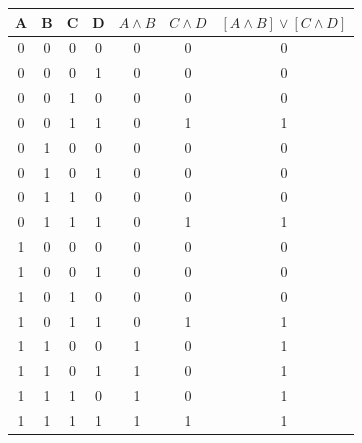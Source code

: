 \documentclass[a4paper,parskip=full-]{article}
\begin{document}
\begin{figure}[H]
    \centering
    \begin{subfigure}[b]{0.4\textwidth}

\begin{tabular}{|c|c|c|c|c|c|c|}
\hline
A & B & C & D & $A \land B$ & $C \land D$ & $[A \land B] \lor [C \land D]$ \\
\hline
0 & 0 & 0 & 0 & 0 & 0 & 0 \\
\hline
0 & 0 & 0 & 1 & 0 & 0 & 0  \\
\hline
0 & 0 & 1 & 0 & 0 & 0 & 0 \\
\hline
0 & 0 & 1 & 1 & 0 & 1 & 1 \\
\hline
0 & 1 & 0 & 0 & 0 & 0 & 0 \\
\hline
0 & 1 & 0 & 1 & 0 & 0 & 0 \\
\hline
0 & 1 & 1 & 0 & 0 & 0 & 0 \\
\hline
0 & 1 & 1 & 1 & 0 & 1 & 1 \\
\hline
1 & 0 & 0 & 0 & 0 & 0 & 0 \\
\hline
1 & 0 & 0 & 1 & 0 & 0 & 0 \\
\hline
1 & 0 & 1 & 0 & 0 & 0 & 0 \\
\hline
1 & 0 & 1 & 1 & 0 & 1 & 1 \\
\hline
1 & 1 & 0 & 0 & 1 & 0 & 1 \\
\hline
1 & 1 & 0 & 1 & 1 & 0 & 1 \\
\hline
1 & 1 & 1 & 0 & 1 & 0 & 1 \\
\hline
1 & 1 & 1 & 1 & 1 & 1 & 1 \\
\hline

\end{tabular}

\end{subfigure}
    \hfill
    \begin{subfigure}[b]{0.4\textwidth}


\end{subfigure}

\end{figure}
\end{document}
